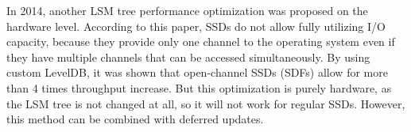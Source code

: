 \documentclass{vldb}
\begin{document}
In 2014, another LSM tree performance optimization was proposed
\cite{Wang:open_channel_ssd} on the hardware level. According to this paper, SSDs
do not allow fully utilizing I/O capacity, because they provide only one channel
to the operating system even if they have multiple channels that can be accessed
simultaneously. By using custom LevelDB, it was shown that open-channel SSDs
(SDFs) allow for more than 4 times throughput increase. But this optimization is
purely hardware, as the LSM tree is not changed at all, so it will not work for
regular SSDs. However, this method can be combined with deferred updates.


\end{document}
